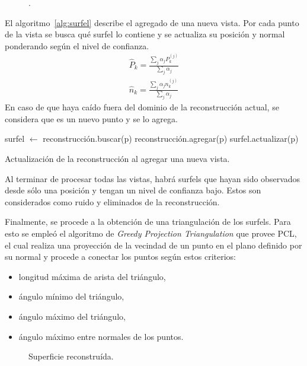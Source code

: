 	\begin{figure}
		\caption{\label{fig:confianza_surfel}.}
	\end{figure}


	El algoritmo~\ref{alg:surfel} describe el agregado de una nueva vista.
	Por cada punto de la vista se busca qué surfel lo contiene y se actualiza
	su posición y normal ponderando según el nivel de confianza.
	\begin{eqnarray*}
		\hat{P}_k = \frac{\sum_{j} \alpha_j P^{(j)}_k}{\sum_{j} \alpha_j} \\
		\hat{n}_k = \frac{\sum_{j} \alpha_j n^{(j)}_k}{\sum_{j} \alpha_j}
	\end{eqnarray*}
	En caso de que haya caído fuera del dominio de la reconstrucción actual, se
	considera que es un nuevo punto y se lo agrega.

	\begin{algorithm}
		\begin{algorithmic}[1]
					\State surfel $\gets$ reconstrucción.buscar(p)
						\State reconstrucción.agregar(p)
					\Else
						\State surfel.actualizar(p)
					\EndIf
				\EndFor
			\EndFunction
		\end{algorithmic}
		\caption{\label{alg:surfel}Actualización de la reconstrucción al agregar una nueva vista.}
	\end{algorithm}

	Al terminar de procesar todas las vistas, habrá surfels que hayan sido
	observados desde sólo una posición y tengan un nivel de confianza bajo.
	Estos son considerados como ruido y eliminados de la
	reconstrucción.

	Finalmente, se procede a la obtención de una triangulación de los surfels.
	Para esto se empleó el algoritmo de \emph{Greedy Projection Triangulation} que provee PCL,
	el cual realiza una proyección de la vecindad de un punto en el plano definido por su normal
	y procede a conectar los puntos según estos criterios:
	\begin{itemize}
		\item longitud máxima de arista del triángulo,
		\item ángulo mínimo del triángulo,
		\item ángulo máximo del triángulo,
		\item ángulo máximo entre normales de los puntos.
	\end{itemize}

	\begin{figure}
		\caption{\label{fig:surface}Superficie reconstruída.}
	\end{figure}
